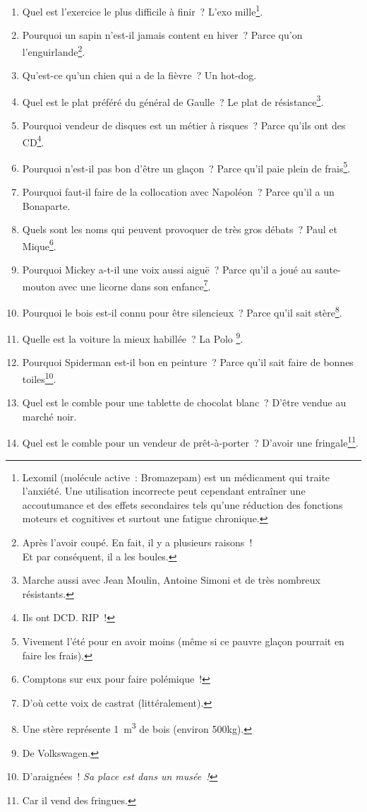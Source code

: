 \documentclass[10pt,a5paper,fullpage]{book}
\begin{document}
\begin{enumerate}
		\item Quel est l'exercice le plus difficile à finir~? L'exo mille\footnote{Lexomil (molécule active~: Bromazepam) est un médicament qui traite l'anxiété. Une utilisation incorrecte peut cependant entraîner une accoutumance et des effets secondaires tels qu'une réduction des fonctions moteurs et cognitives et surtout une fatigue chronique.}. 
		\item Pourquoi un sapin n’est-il jamais content en hiver~? Parce qu’on l’enguirlande\footnote{Après l'avoir coupé. En fait, il y a plusieurs raisons~!\\Et par conséquent, il a les boules.}.
		\item Qu'est-ce qu'un chien qui a de la fièvre~? Un hot-dog. 
		\item Quel est le plat préféré du général de Gaulle~? Le plat de résistance\footnote{Marche aussi avec Jean Moulin, Antoine Simoni et de très nombreux résistants.}.
		\item Pourquoi vendeur de disques est un métier à risques~? Parce qu’ils ont des CD\footnote{Ils ont DCD. RIP~!}.
		\item Pourquoi n’est-il pas bon d’être un glaçon~? Parce qu’il paie plein de frais\footnote{Vivement l'été pour en avoir moins (même si ce pauvre glaçon pourrait en faire les frais).}.
		\item Pourquoi faut-il faire de la collocation avec Napoléon~? Parce qu’il a un Bonaparte.
		\item Quels sont les noms qui peuvent provoquer de très gros débats~? Paul et Mique\footnote{Comptons sur eux pour faire polémique~!}.
		\item Pourquoi Mickey a-t-il une voix aussi aiguë~? Parce qu’il a joué au saute-mouton avec une licorne dans son enfance\footnote{D'où cette voix de castrat (littéralement).}.	
		\item Pourquoi le bois est-il connu pour être silencieux~? Parce qu’il sait stère\footnote{Une stère représente 1~m\textsuperscript{3} de bois (environ 500kg).}.
		\item Quelle est la voiture la mieux habillée~? La Polo \footnote{De Volkswagen.}.
		\item Pourquoi Spiderman est-il bon en peinture~? Parce qu’il sait faire de bonnes toiles\footnote{D'araignées~! \textit{Sa place est dans un musée~!}}.
		\item Quel est le comble pour une tablette de chocolat blanc~? D’être vendue au marché noir. 
		\item Quel est le comble pour un vendeur de prêt-à-porter~? D’avoir une fringale\footnote{Car il vend des fringues.}.

\end{enumerate}
\end{document}
